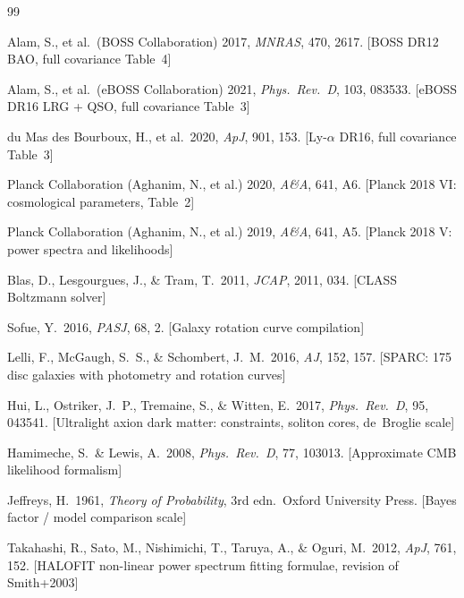 \documentclass[12pt,a4paper]{article}
\begin{document}

\begin{thebibliography}{99}

Alam, S., et al.\ (BOSS Collaboration) 2017,
\textit{MNRAS}, 470, 2617.
[BOSS DR12 BAO, full covariance Table~4]

Alam, S., et al.\ (eBOSS Collaboration) 2021,
\textit{Phys.\ Rev.\ D}, 103, 083533.
[eBOSS DR16 LRG + QSO, full covariance Table~3]

du Mas des Bourboux, H., et al.\ 2020,
\textit{ApJ}, 901, 153.
[Ly-$\alpha$ DR16, full covariance Table~3]

Planck Collaboration (Aghanim, N., et al.) 2020,
\textit{A\&A}, 641, A6.
[Planck 2018 VI: cosmological parameters, Table~2]

Planck Collaboration (Aghanim, N., et al.) 2019,
\textit{A\&A}, 641, A5.
[Planck 2018 V: power spectra and likelihoods]

Blas, D., Lesgourgues, J., \& Tram, T.\ 2011,
\textit{JCAP}, 2011, 034.
[CLASS Boltzmann solver]

Sofue, Y.\ 2016, \textit{PASJ}, 68, 2.
[Galaxy rotation curve compilation]

Lelli, F., McGaugh, S.~S., \& Schombert, J.~M.\ 2016,
\textit{AJ}, 152, 157.
[SPARC: 175 disc galaxies with photometry and rotation curves]

Hui, L., Ostriker, J.~P., Tremaine, S., \& Witten, E.\ 2017,
\textit{Phys.\ Rev.\ D}, 95, 043541.
[Ultralight axion dark matter: constraints, soliton cores, de~Broglie scale]

Hamimeche, S.\ \& Lewis, A.\ 2008,
\textit{Phys.\ Rev.\ D}, 77, 103013.
[Approximate CMB likelihood formalism]

Jeffreys, H.\ 1961,
\textit{Theory of Probability}, 3rd edn.\ Oxford University Press.
[Bayes factor / model comparison scale]

Takahashi, R., Sato, M., Nishimichi, T., Taruya, A., \& Oguri, M.\ 2012,
\textit{ApJ}, 761, 152.
[HALOFIT non-linear power spectrum fitting formulae, revision of Smith+2003]


\end{thebibliography}
\end{document}

